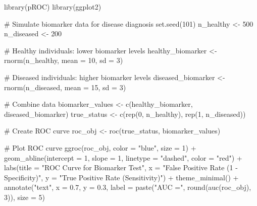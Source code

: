 \documentclass[
  11pt,
  letterpaper,
  oneside]{book}
\newenvironment{Shaded}{\begin{snugshade}}{\end{snugshade}}
\newcommand{\AttributeTok}[1]{\textcolor[rgb]{0.40,0.45,0.13}{#1}}
\newcommand{\CommentTok}[1]{\textcolor[rgb]{0.37,0.37,0.37}{#1}}
\newcommand{\DecValTok}[1]{\textcolor[rgb]{0.68,0.00,0.00}{#1}}
\newcommand{\FloatTok}[1]{\textcolor[rgb]{0.68,0.00,0.00}{#1}}
\newcommand{\FunctionTok}[1]{\textcolor[rgb]{0.28,0.35,0.67}{#1}}
\newcommand{\NormalTok}[1]{\textcolor[rgb]{0.00,0.23,0.31}{#1}}
\newcommand{\OtherTok}[1]{\textcolor[rgb]{0.00,0.23,0.31}{#1}}
\newcommand{\SpecialCharTok}[1]{\textcolor[rgb]{0.37,0.37,0.37}{#1}}
\newcommand{\StringTok}[1]{\textcolor[rgb]{0.13,0.47,0.30}{#1}}
\begin{document}
\begin{Shaded}
\begin{Highlighting}[]
\FunctionTok{library}\NormalTok{(pROC)}
\FunctionTok{library}\NormalTok{(ggplot2)}

\CommentTok{\# Simulate biomarker data for disease diagnosis}
\FunctionTok{set.seed}\NormalTok{(}\DecValTok{101}\NormalTok{)}
\NormalTok{n\_healthy }\OtherTok{\textless{}{-}} \DecValTok{500}
\NormalTok{n\_diseased }\OtherTok{\textless{}{-}} \DecValTok{200}

\CommentTok{\# Healthy individuals: lower biomarker levels}
\NormalTok{healthy\_biomarker }\OtherTok{\textless{}{-}} \FunctionTok{rnorm}\NormalTok{(n\_healthy, }\AttributeTok{mean =} \DecValTok{10}\NormalTok{, }\AttributeTok{sd =} \DecValTok{3}\NormalTok{)}

\CommentTok{\# Diseased individuals: higher biomarker levels}
\NormalTok{diseased\_biomarker }\OtherTok{\textless{}{-}} \FunctionTok{rnorm}\NormalTok{(n\_diseased, }\AttributeTok{mean =} \DecValTok{15}\NormalTok{, }\AttributeTok{sd =} \DecValTok{3}\NormalTok{)}

\CommentTok{\# Combine data}
\NormalTok{biomarker\_values }\OtherTok{\textless{}{-}} \FunctionTok{c}\NormalTok{(healthy\_biomarker, diseased\_biomarker)}
\NormalTok{true\_status }\OtherTok{\textless{}{-}} \FunctionTok{c}\NormalTok{(}\FunctionTok{rep}\NormalTok{(}\DecValTok{0}\NormalTok{, n\_healthy), }\FunctionTok{rep}\NormalTok{(}\DecValTok{1}\NormalTok{, n\_diseased))}

\CommentTok{\# Create ROC curve}
\NormalTok{roc\_obj }\OtherTok{\textless{}{-}} \FunctionTok{roc}\NormalTok{(true\_status, biomarker\_values)}

\CommentTok{\# Plot ROC curve}
\FunctionTok{ggroc}\NormalTok{(roc\_obj, }\AttributeTok{color =} \StringTok{"blue"}\NormalTok{, }\AttributeTok{size =} \DecValTok{1}\NormalTok{) }\SpecialCharTok{+}
  \FunctionTok{geom\_abline}\NormalTok{(}\AttributeTok{intercept =} \DecValTok{1}\NormalTok{, }\AttributeTok{slope =} \DecValTok{1}\NormalTok{, }\AttributeTok{linetype =} \StringTok{"dashed"}\NormalTok{, }\AttributeTok{color =} \StringTok{"red"}\NormalTok{) }\SpecialCharTok{+}
  \FunctionTok{labs}\NormalTok{(}\AttributeTok{title =} \StringTok{"ROC Curve for Biomarker Test"}\NormalTok{,}
       \AttributeTok{x =} \StringTok{"False Positive Rate (1 {-} Specificity)"}\NormalTok{,}
       \AttributeTok{y =} \StringTok{"True Positive Rate (Sensitivity)"}\NormalTok{) }\SpecialCharTok{+}
  \FunctionTok{theme\_minimal}\NormalTok{() }\SpecialCharTok{+}
  \FunctionTok{annotate}\NormalTok{(}\StringTok{"text"}\NormalTok{, }\AttributeTok{x =} \FloatTok{0.7}\NormalTok{, }\AttributeTok{y =} \FloatTok{0.3}\NormalTok{,}
           \AttributeTok{label =} \FunctionTok{paste}\NormalTok{(}\StringTok{"AUC ="}\NormalTok{, }\FunctionTok{round}\NormalTok{(}\FunctionTok{auc}\NormalTok{(roc\_obj), }\DecValTok{3}\NormalTok{)), }\AttributeTok{size =} \DecValTok{5}\NormalTok{)}
\end{Highlighting}
\end{Shaded}
\end{document}
